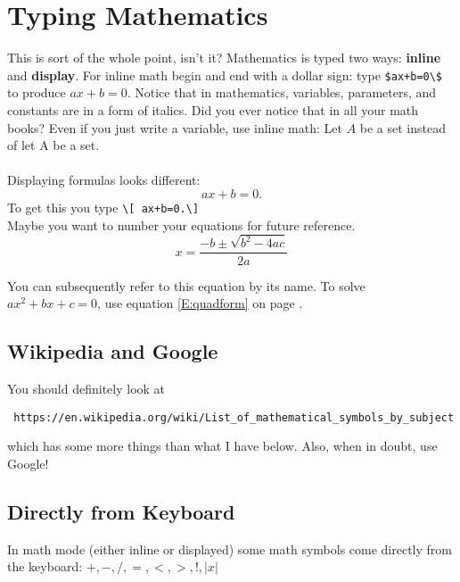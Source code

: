 \documentclass[12pt]{article}
\theoremstyle{definition}
\begin{document}
\section{Typing Mathematics}
This is sort of the whole point, isn't it?  Mathematics is typed two ways: \textbf{inline} and \textbf{display}.  For inline math begin and end with a dollar sign: type \verb!$ax+b=0\$! to produce $ax+b=0$.
Notice that in mathematics,  variables, parameters, and constants are in a form of italics.  Did you ever notice that in all your math books?  Even if you just write a variable, use inline math: Let $A$ be a set instead of let A be a set.
\\ \\
Displaying formulas looks different:
\[
ax+b=0.
\]
To get this you type \verb!\[ ax+b=0.\]!
\\Maybe you want to number your equations for future reference.
\begin{equation}\label{E:quadform}
x=\frac{-b\pm\sqrt{b^{2}-4ac}}{2a}
\end{equation}

You can subsequently refer to this equation by its name. To solve $ax^{2}+bx+c=0$, use equation \eqref{E:quadform} on page \pageref{E:quadform}.

\subsection{Wikipedia and Google}
You should definitely look at \begin{verbatim} https://en.wikipedia.org/wiki/List_of_mathematical_symbols_by_subject \end{verbatim} 
which has some more things than what I have below.  Also, when in doubt, use Google!
\subsection{Directly from Keyboard}
In math mode (either inline or displayed) some math symbols come directly from the keyboard: $+, -, /, =, <, >,!,|x|$
\end{document}
